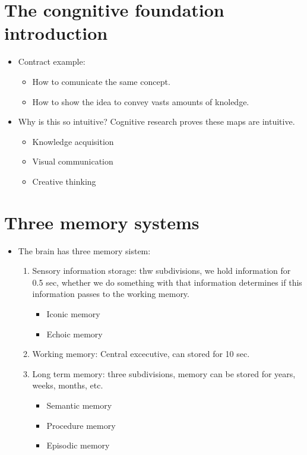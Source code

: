 \section{The congnitive foundation introduction}
\begin{itemize}
    \item Contract example: 
        \begin{itemize}
            \item How to comunicate the same concept.
            \item How to show the idea to convey vasts amounts of knoledge. 
        \end{itemize}
    
    \item Why is this so intuitive? Cognitive research proves these maps are intuitive.
        \begin{itemize}
            \item Knowledge acquisition 
            \item Visual communication 
            \item Creative thinking 
        \end{itemize}
\end{itemize}


\section{Three memory systems}
\begin{itemize}
    \item The brain has three memory sistem:
        \begin{enumerate}
            \item Sensory information storage: thw subdivisions, we hold information for 0.5 sec, whether we do something with that information determines if this information passes to the working memory.
                \begin{itemize}
                    \item Iconic memory 
                    \item Echoic memory
                \end{itemize}
            
            \item Working memory: Central excecutive, can stored for 10 sec.
            \item Long term memory: three subdivisions, memory can be stored for years, weeks, months, etc.
                \begin{itemize}
                    \item Semantic memory
                    \item Procedure memory 
                    \item Episodic memory 
                \end{itemize}
        \end{enumerate}
\end{itemize}


